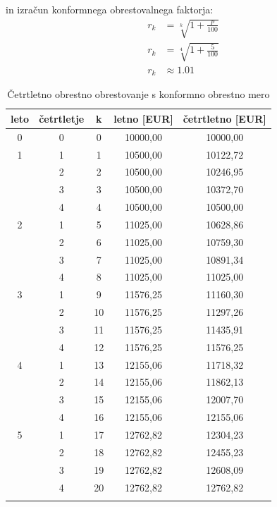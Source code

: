 \documentclass[12pt]{article}
\begin{document}
        in izračun konformnega obrestovalnega faktorja:
        \begin{equation}
            \begin{split}
                r_k & = \sqrt[k]{1 + \frac{p}{100}} \\
                r_k & = \sqrt[4]{1 + \frac{5}{100}} \\
                r_k & \approx 1.01
            \end{split}
        \end{equation}

        \begin{longtable}{|c|c|c|c|c|}
            \hline
            \textbf{leto} & \textbf{četrtletje} & \textbf{k} & \textbf{letno [EUR]} & \textbf{četrtletno [EUR]} \\ \hline
            \endfirsthead
            \endhead
            0 & 0 & 0  & 10000,00  & 10000,00  \\ \hline \hline
            1 & 1 & 1  & 10500,00  & 10122,72  \\ \hline
              & 2 & 2  & 10500,00  & 10246,95  \\ \hline
              & 3 & 3  & 10500,00  & 10372,70  \\ \hline
              & 4 & 4  & 10500,00  & 10500,00  \\ \hline \hline
            2 & 1 & 5  & 11025,00  & 10628,86  \\ \hline
              & 2 & 6  & 11025,00  & 10759,30  \\ \hline
              & 3 & 7  & 11025,00  & 10891,34  \\ \hline
              & 4 & 8  & 11025,00  & 11025,00  \\ \hline \hline
            3 & 1 & 9  & 11576,25  & 11160,30  \\ \hline
              & 2 & 10 & 11576,25  & 11297,26  \\ \hline
              & 3 & 11 & 11576,25  & 11435,91  \\ \hline
              & 4 & 12 & 11576,25  & 11576,25  \\ \hline \hline
            4 & 1 & 13 & 12155,06  & 11718,32  \\ \hline
              & 2 & 14 & 12155,06  & 11862,13  \\ \hline
              & 3 & 15 & 12155,06  & 12007,70  \\ \hline
              & 4 & 16 & 12155,06  & 12155,06  \\ \hline \hline
            5 & 1 & 17 & 12762,82  & 12304,23  \\ \hline
              & 2 & 18 & 12762,82  & 12455,23  \\ \hline
              & 3 & 19 & 12762,82  & 12608,09  \\ \hline
              & 4 & 20 & 12762,82  & 12762,82  \\ \hline
              \caption{Četrtletno obrestno obrestovanje s konformno obrestno mero}
        \end{longtable}
\end{document}
